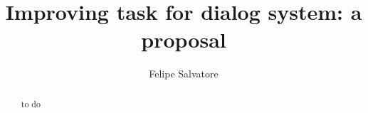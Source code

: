 \documentclass[12pt]{report}
\title{Improving task for dialog system: a proposal}
\author{Felipe Salvatore}
\begin{document}
\maketitle

\begin{abstract}
to do
\end{abstract}
\tableofcontents









\end{document}
